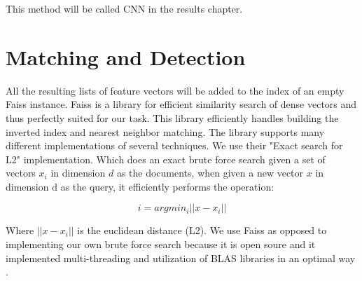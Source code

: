 \documentclass{report}
\begin{document}
This method will be called CNN in the results chapter.


\section{Matching and Detection}

All the resulting lists of feature vectors will be added to the index of an empty Faiss instance. Faiss is a library for efficient similarity search of dense vectors \cite{faiss, faiss-github} and thus perfectly suited for our task. This library efficiently handles building the inverted index and nearest neighbor matching. The library supports many different implementations of several techniques. We use their "Exact search for L2" implementation. Which does an exact brute force search given a set of vectors $x_i$ in dimension $d$ as the documents, when given a new vector $x$ in dimension d as the query, it efficiently performs the operation:

\[i = argmin_i||x - x_i||\]

\noindent Where $||x - x_i||$ is the euclidean distance (L2). We use Faiss as opposed to implementing our own brute force search because it is open soure and it implemented multi-threading and utilization of BLAS libraries in an optimal way \cite{faiss-blog}.
\\
\end{document}
